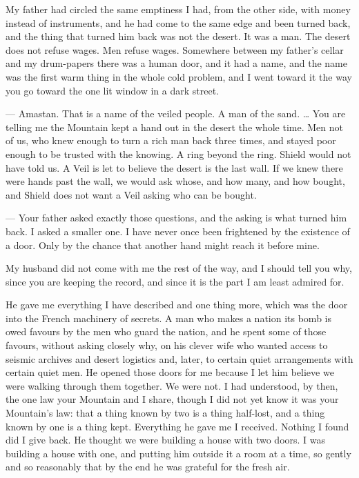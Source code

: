 My father had circled the same emptiness I had, from the other side, with money instead of instruments, and he had come to the same edge and been turned back, and the thing that turned him back was not the desert. It was a man. The desert does not refuse wages. Men refuse wages. Somewhere between my father's cellar and my drum-papers there was a human door, and it had a name, and the name was the first warm thing in the whole cold problem, and I went toward it the way you go toward the one lit window in a dark street.\par

\begin{room}

--- Amastan. That is a name of the veiled people. A man of the sand. \ldots{} You are telling me the Mountain kept a hand out in the desert the whole time. Men not of us, who knew enough to turn a rich man back three times, and stayed poor enough to be trusted with the knowing. A ring beyond the ring. Shield would not have told us. A Veil is let to believe the desert is the last wall. If we knew there were hands past the wall, we would ask whose, and how many, and how bought, and Shield does not want a Veil asking who can be bought.

--- Your father asked exactly those questions, and the asking is what turned him back. I asked a smaller one. I have never once been frightened by the existence of a door. Only by the chance that another hand might reach it before mine.

\end{room}

My husband did not come with me the rest of the way, and I should tell you why, since you are keeping the record, and since it is the part I am least admired for.\par

He gave me everything I have described and one thing more, which was the door into the French machinery of secrets. A man who makes a nation its bomb is owed favours by the men who guard the nation, and he spent some of those favours, without asking closely why, on his clever wife who wanted access to seismic archives and desert logistics and, later, to certain quiet arrangements with certain quiet men. He opened those doors for me because I let him believe we were walking through them together. We were not. I had understood, by then, the one law your Mountain and I share, though I did not yet know it was your Mountain's law: that a thing known by two is a thing half-lost, and a thing known by one is a thing kept. Everything he gave me I received. Nothing I found did I give back. He thought we were building a house with two doors. I was building a house with one, and putting him outside it a room at a time, so gently and so reasonably that by the end he was grateful for the fresh air.\par

